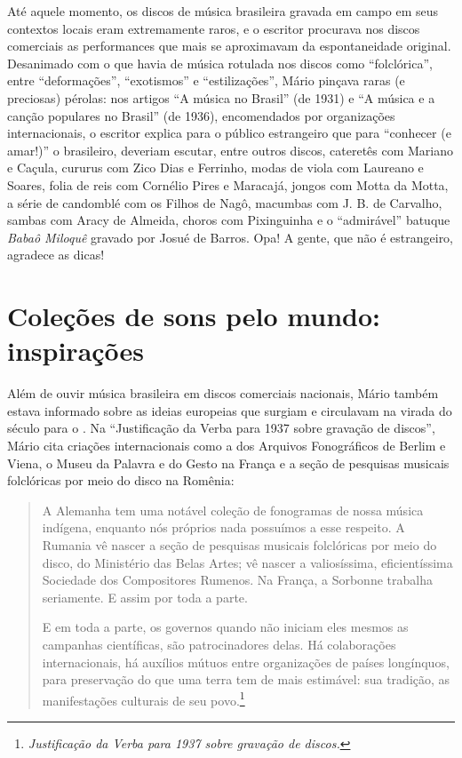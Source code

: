 Até aquele momento, os discos de música brasileira gravada em campo em
seus contextos locais eram extremamente raros, e o escritor procurava
nos discos comerciais as performances que mais se aproximavam da
espontaneidade original. Desanimado com o que havia de música rotulada
nos discos como ``folclórica'', entre ``deformações'', ``exotismos'' e
``estilizações'', Mário pinçava raras (e preciosas) pérolas: nos
artigos ``A música no Brasil'' (de 1931) e ``A música e a canção
populares no Brasil'' (de 1936), encomendados por organizações
internacionais, o escritor explica para o público estrangeiro que para
``conhecer (e amar!)'' o brasileiro, deveriam escutar, entre outros
discos, cateretês com Mariano e Caçula, cururus com Zico Dias e
Ferrinho, modas de viola com Laureano e Soares, folia de reis com
Cornélio Pires e Maracajá, jongos com Motta da Motta, a série de
candomblé com os Filhos de Nagô, macumbas com J. B. de Carvalho, sambas
com Aracy de Almeida, choros com Pixinguinha e o ``admirável'' batuque
\emph{Babaô Miloquê} gravado por Josué de Barros. Opa! A gente, que não
é estrangeiro, agradece as dicas!

\section*{Coleções de sons pelo mundo: inspirações}

Além de ouvir música brasileira em discos comerciais nacionais, Mário
também estava informado sobre as ideias europeias que surgiam e
circulavam na virada do século  para o . Na ``Justificação da Verba
para 1937 sobre gravação de discos'', Mário cita criações internacionais
como a dos Arquivos Fonográficos de Berlim e Viena, o Museu da Palavra e
do Gesto na França e a seção de pesquisas musicais folclóricas por meio
do disco na Romênia:

\begin{quote}
A Alemanha tem uma notável coleção de fonogramas de nossa música
indígena, enquanto nós próprios nada possuímos a esse respeito. A
Rumania vê nascer a seção de pesquisas musicais folclóricas por meio do
disco, do Ministério das Belas Artes; vê nascer a valiosíssima,
eficientíssima Sociedade dos Compositores Rumenos. Na França, a Sorbonne
trabalha seriamente. E assim por toda a parte.

E em toda a parte, os governos quando não iniciam eles mesmos as
campanhas científicas, são patrocinadores delas. Há colaborações
internacionais, há auxílios mútuos entre organizações de países
longínquos, para preservação do que uma terra tem de mais estimável: sua
tradição, as manifestações culturais de seu povo.\footnote{\emph{Justificação
  da Verba para 1937 sobre gravação de discos.}}
\end{quote}

